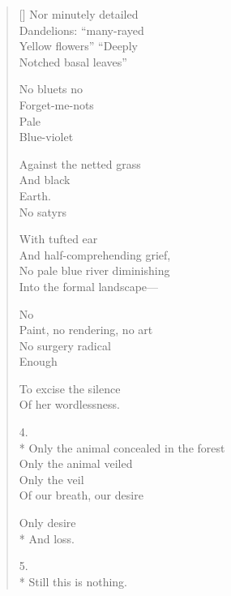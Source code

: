 \begin{verse}[\versewidth]
Nor minutely detailed\\
Dandelions: ``many-rayed\\
Yellow flowers'' ``Deeply\\
Notched basal leaves''

No bluets \quad no\\
Forget-me-nots\\
Pale\\
Blue-violet

Against the netted grass\\
And black\\
Earth.\\
No satyrs

With tufted ear\\
And half-comprehending grief,\\
No pale blue river diminishing\\
Into the formal landscape---

No\\
Paint, no rendering, no art\\
No surgery radical\\
Enough

To excise the silence\\
Of her wordlessness.

4.\\*
Only the animal concealed in the forest\\
Only the animal veiled\\
Only the veil\\
Of our breath, our desire

Only desire\\*
And loss.

5.\\*
Still this is nothing. 
\end{verse}
